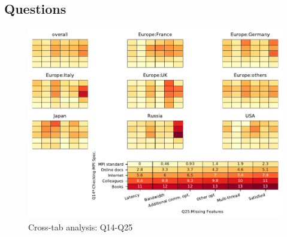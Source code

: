 
\subsection{Questions}


\begin{figure}
\begin{center}
\includegraphics[width=12cm]{../pdfs/Q14-Q25.pdf}
\caption{Cross-tab analysis: Q14-Q25}
\label{fig:Q14-Q25}
\end{center}
\end{figure}
